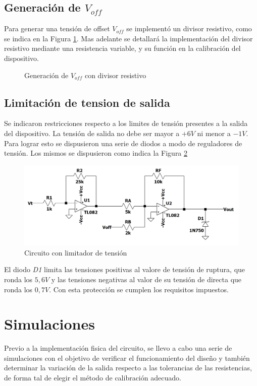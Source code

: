 \subsection{Generación de $V_{off}$}

Para generar una tensión de offset $V_{off}$ se implementó un divisor resistivo, como se indica en la Figura \ref{6_v_off}. Mas adelante se detallará la implementación del divisor resistivo mediante una resistencia variable, y su función en la calibración del dispositivo.

\begin{figure}[H]
\centering

\caption{Generación de $V_{off}$ con divisor resistivo}
\label{6_v_off}
\end{figure}

\subsection{Limitación de tension de salida}
Se indicaron restricciones respecto a los limites de tensión presentes a la salida del dispositivo. La tensión de salida no debe ser mayor a $+6V$ ni menor a $-1V$. Para lograr esto se dispusieron una serie de diodos a modo de reguladores de tensión. Los mismos se dispusieron como indica la Figura \ref{6_diodos}

\begin{figure}[H]
\centering
\includegraphics[scale=0.5]{../parte6/Informe/resources/esquematico_opamps_diodos.png}
\caption{Circuito con limitador de tensión}
\label{6_diodos}
\end{figure}

El diodo \emph{D1} limita las tensiones positivas al valore de tensión de ruptura, que ronda los $5,6V$ y las tensiones negativas al valor de su tensión de directa que ronda los $0,7V$. Con esta protección se cumplen los requisitos impuestos.

\section{Simulaciones}
Previo a la implementación fisica del circuito, se llevo a cabo una serie de simulaciones con el objetivo de verificar el funcionamiento del diseño y también determinar la variación de la salida respecto a las tolerancias de las resistencias, de forma tal de elegir el método de calibración adecuado.

